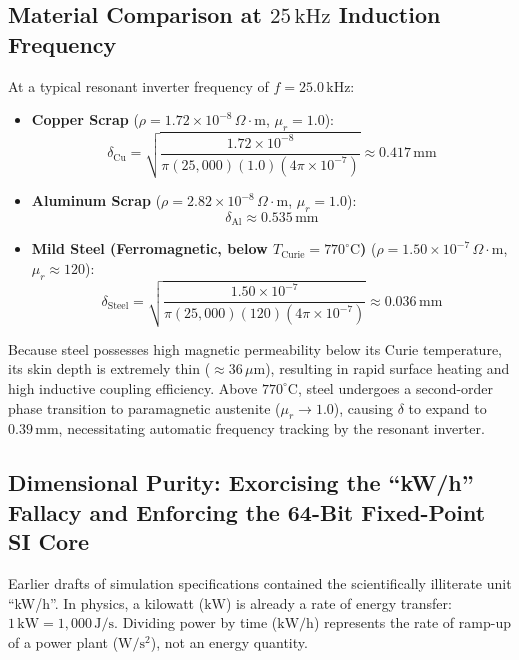 \subsection{Material Comparison at \texorpdfstring{$25\,\mathrm{kHz}$}{25 kHz} Induction Frequency}
At a typical resonant inverter frequency of $f = 25.0\,\mathrm{kHz}$:
\begin{itemize}
    \item \textbf{Copper Scrap} ($\rho = 1.72 \times 10^{-8}\,\Omega\cdot\mathrm{m}$, $\mu_r = 1.0$):
    \begin{equation}
    \delta_{\mathrm{Cu}} = \sqrt{ \frac{1.72 \times 10^{-8}}{\pi (25,000)(1.0)(4\pi \times 10^{-7})} } \approx 0.417\,\mathrm{mm}
    \label{eq:skin_depth_cu}
    \end{equation}
    \item \textbf{Aluminum Scrap} ($\rho = 2.82 \times 10^{-8}\,\Omega\cdot\mathrm{m}$, $\mu_r = 1.0$):
    \begin{equation}
    \delta_{\mathrm{Al}} \approx 0.535\,\mathrm{mm}
    \label{eq:skin_depth_al}
    \end{equation}
    \item \textbf{Mild Steel (Ferromagnetic, below $T_{\mathrm{Curie}} = 770^\circ\mathrm{C}$)} ($\rho = 1.50 \times 10^{-7}\,\Omega\cdot\mathrm{m}$, $\mu_r \approx 120$):
    \begin{equation}
    \delta_{\mathrm{Steel}} = \sqrt{ \frac{1.50 \times 10^{-7}}{\pi (25,000)(120)(4\pi \times 10^{-7})} } \approx 0.036\,\mathrm{mm}
    \label{eq:skin_depth_steel}
    \end{equation}
\end{itemize}
Because steel possesses high magnetic permeability below its Curie temperature, its skin depth is extremely thin ($\approx 36\,\mu\mathrm{m}$), resulting in rapid surface heating and high inductive coupling efficiency. Above $770^\circ\mathrm{C}$, steel undergoes a second-order phase transition to paramagnetic austenite ($\mu_r \to 1.0$), causing $\delta$ to expand to $0.39\,\mathrm{mm}$, necessitating automatic frequency tracking by the resonant inverter.

\subsection{Dimensional Purity: Exorcising the ``kW/h'' Fallacy and Enforcing the 64-Bit Fixed-Point SI Core}
Earlier drafts of simulation specifications contained the scientifically illiterate unit ``kW/h''. In physics, a kilowatt ($\mathrm{kW}$) is already a rate of energy transfer: $1\,\mathrm{kW} = 1,000\,\mathrm{J/s}$. Dividing power by time ($\mathrm{kW/h}$) represents the rate of ramp-up of a power plant ($\mathrm{W/s^2}$), not an energy quantity. 

